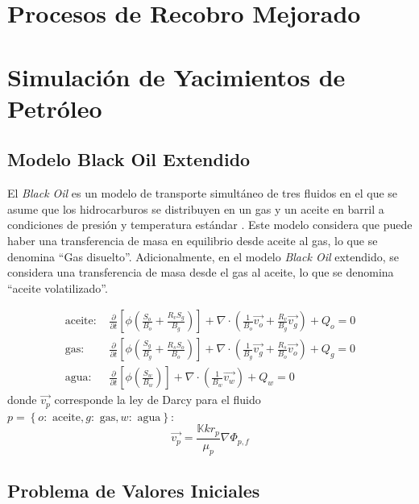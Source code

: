 \section{Procesos de Recobro Mejorado}

\section{Simulación de Yacimientos de Petróleo}
\subsection{Modelo Black Oil Extendido}

El \textit{Black Oil} es un modelo de transporte simultáneo de tres fluidos en el que se asume que los hidrocarburos se distribuyen en un gas y un aceite en barril a condiciones de presión y temperatura estándar \citep{chen2007reservoir}. Este modelo considera que puede haber una transferencia de masa en equilibrio desde aceite al gas, lo que se denomina ``Gas disuelto''. Adicionalmente, en el modelo \textit{Black Oil} extendido, se considera una transferencia de masa desde el gas al aceite, lo que se denomina ``aceite volatilizado''.

\begin{align}
\label{ec:aceite}
\text{aceite: }&\frac{\partial}{\partial t} \left[ \phi \left( \frac{S_{o}}{B_{o}} + \frac{R_{v} S_{g}}{B_{g}} \right) \right]
+ \nabla \cdot \left( \frac{1}{B_{o}} \vec{v_{o}} + \frac{R_{v}}{B_{g}} \vec{v_{g}} \right) + Q_{o} = 0 \\
\label{ec:gas}
\text{gas: }&\frac{\partial}{\partial t} \left[ \phi \left( \frac{S_{g}}{B_{g}} + \frac{R_{s} S_{o}}{B_{o}} \right) \right]
+ \nabla \cdot \left( \frac{1}{B_{g}} \vec{v_{g}} + \frac{R_{s}}{B_{o}} \vec{v_{o}} \right) + Q_{g} = 0\\
\label{ec:agua}
\text{agua: }&\frac{\partial}{\partial t} \left[\phi \left( \frac{S_{w}}{B_{w}} \right) \right] + \nabla \cdot \left( \frac{1}{B_{w}} \vec{v_{w}} \right) + Q_{w} = 0
\end{align}
donde $\vec{v_{p}}$ corresponde la ley de Darcy para el fluido $p = \left\lbrace o:\text{ aceite}, g:\text{ gas}, w:\text{ agua} \right\rbrace $:
\begin{equation}
\vec{v_{p}}=\frac{\mathbb{K} kr_{p}}{\mu_{p} } \nabla{\Phi_{p,f}}
\end{equation}
\subsection{Problema de Valores Iniciales}
%
